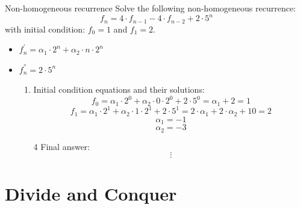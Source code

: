 \documentclass{beamer}
\begin{document}
\begin{frame}{Non-homogeneous recurrence}
    Solve the following non-homogeneous recurrence:
    \begin{equation}\tag{1}
        f_n = 4 \cdot f_{n-1} - 4 \cdot f_{n-2} + 2 \cdot 5^n
    \end{equation}
    with initial condition: $f_0 = 1$ and $f_1 = 2$.
    
    \begin{itemize}
        \item $ f_n^{'} = \alpha_1 \cdot 2^n + \alpha_2 \cdot n \cdot 2^n $
        \item $ f_n^{''} = 2 \cdot 5^n $
        \begin{enumerate}[3]
            \item Initial condition equations and their solutions:
                $$ f_0 = \alpha_1 \cdot 2^0 + \alpha_2 \cdot 0 \cdot 2^0 + 2 \cdot 5^0  = \alpha_1 + 2 = 1 $$
                $$ f_1 = \alpha_1 \cdot 2^1 + \alpha_2 \cdot 1 \cdot 2^1 + 2 \cdot 5^1  = 2 \cdot \alpha_1 + 2 \cdot \alpha_2 + 10 = 2 $$
                $$ \alpha_1 = -1 $$
                $$ \alpha_2 = -3 $$
            \item[4] Final answer:
                $$ \vdots $$
        \end{enumerate}
    \end{itemize}
\end{frame}

\section{Divide and Conquer}
\end{document}
